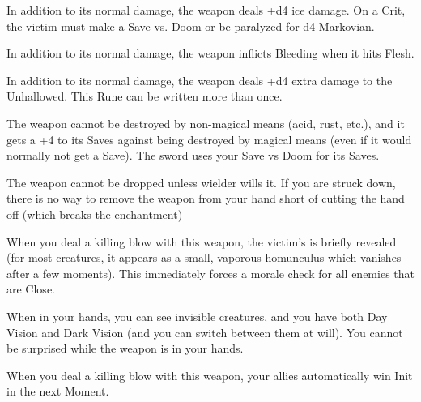 {


In addition to its normal damage, the weapon deals +d4 ice damage.  On a Crit, the victim must make a Save vs. Doom or be paralyzed for d4 Markovian.



In addition to its normal damage, the weapon inflicts Bleeding when it hits Flesh.






In addition to its normal damage, the weapon deals +d4 extra damage to the Unhallowed.  This Rune can be written more than once.



The weapon cannot be destroyed by non-magical means (acid, rust, etc.), and it gets a +4 to its Saves against being destroyed by magical means (even if it would normally not get a Save).  The sword uses your Save vs Doom for its Saves.


The weapon cannot be dropped unless wielder wills it.  If you are struck down, there is no way to remove the weapon from your hand short of cutting the hand off (which breaks the enchantment)



When you deal a killing blow with this weapon, the victim's  is briefly revealed (for most creatures, it appears as a small, vaporous homunculus which vanishes after a few moments).  This immediately forces a morale check for all enemies that are Close.



When in your hands, you can see invisible creatures, and you have both Day Vision and Dark Vision (and you can switch between them at will).  You cannot be surprised while the weapon is in your hands.



When you deal a killing blow with this weapon, your allies automatically win Init in the next Moment.


}%
